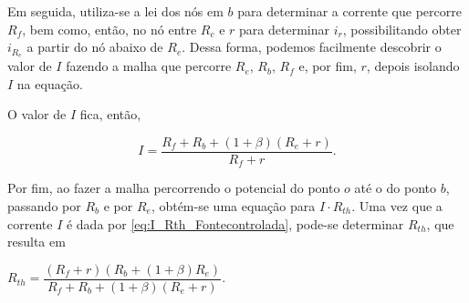 \documentclass{article}
\numberwithin{equation}{section}
\newlength\Colsep
\begin{document}
\noindent\begin{minipage}{0.95\textwidth}
\begin{minipage}[c][8cm][c]{\dimexpr0.65\textwidth-0.5\Colsep\relax}
    \begin{center}
    \end{center}
\end{minipage} \hfill
\begin{minipage}[c][8cm][c]{\dimexpr0.35\textwidth-0.5\Colsep\relax}
    Em seguida, utiliza-se a lei dos nós em $b$ para determinar a corrente que percorre $R_{f}$, bem como, então, no nó entre $R_c$ e $r$ para determinar $i_r$, possibilitando obter $i_{R_e}$ a partir do nó abaixo de $R_e$. Dessa forma, podemos facilmente descobrir o valor de $I$ fazendo a malha que percorre $R_e$, $R_b$, $R_{f}$ e, por fim, $r$, depois isolando $I$ na equação.
\end{minipage}
\end{minipage}

\noindent O valor de $I$ fica, então,

\begin{equation}
    I = \dfrac{R_{f} + R_b + (1+\beta)(R_e + r)}{R_{f}+r}. \label{eq:I_Rth_Fontecontrolada}
\end{equation}

\noindent Por fim, ao fazer a malha percorrendo o potencial do ponto $o$ até o do ponto $b$, passando por $R_b$ e por $R_e$, obtém-se uma equação para $I\cdot R_{th}$. Uma vez que a corrente $I$ é dada por \eqref{eq:I_Rth_Fontecontrolada}, pode-se determinar $R_{th}$, que resulta em

\begin{center}
    $R_{th} = \dfrac{(R_{f}+r)(R_b + (1+\beta)R_e)}{R_{f}+R_b+(1+\beta)(R_e+r)}$.
\end{center}
\end{document}
